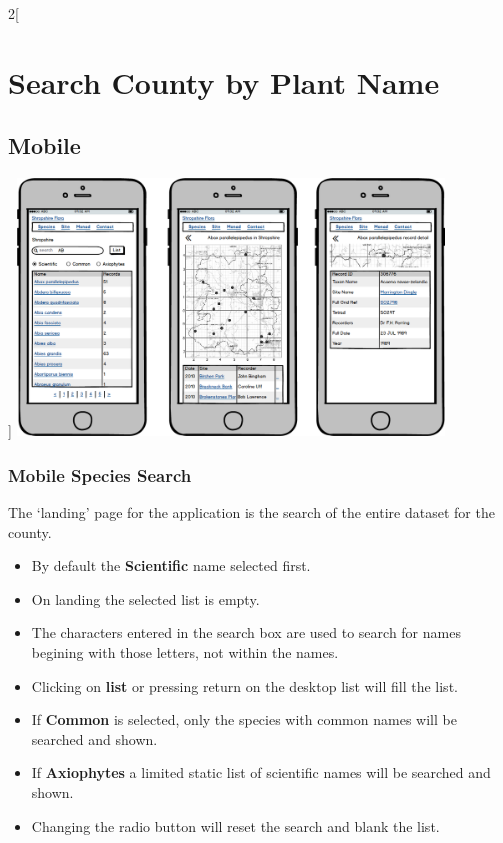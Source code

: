 \documentclass[a4paper,12pt,landscape]{article}
\begin{document}
\begin{multicols*}{2}[%
  \section{Search County by Plant Name}%
  \subsection{Mobile}%
]
\includegraphics[width=0.85\textwidth,height=\textheight,keepaspectratio]{./wireframes/county-mobile.png}%
\clearpage

\subsubsection{Mobile Species Search}
The `landing' page for the application is the search of the entire dataset for the county.

\begin{itemize}
  \item By default the \textbf{Scientific} name selected first.
  \item On landing the selected list is empty.
  \item The characters entered in the search box are used to search for names begining with those letters,
    not within the names.
  \item Clicking on \textbf{list} or pressing return on the desktop list will fill the list.
  \item If \textbf{Common} is selected, only the species with common names will be searched and shown.
  \item If \textbf{Axiophytes} a limited static list of scientific names will be searched and shown.
  \item Changing the radio button will reset the search and blank the list.
\end{itemize}


\end{multicols*}
\end{document}
